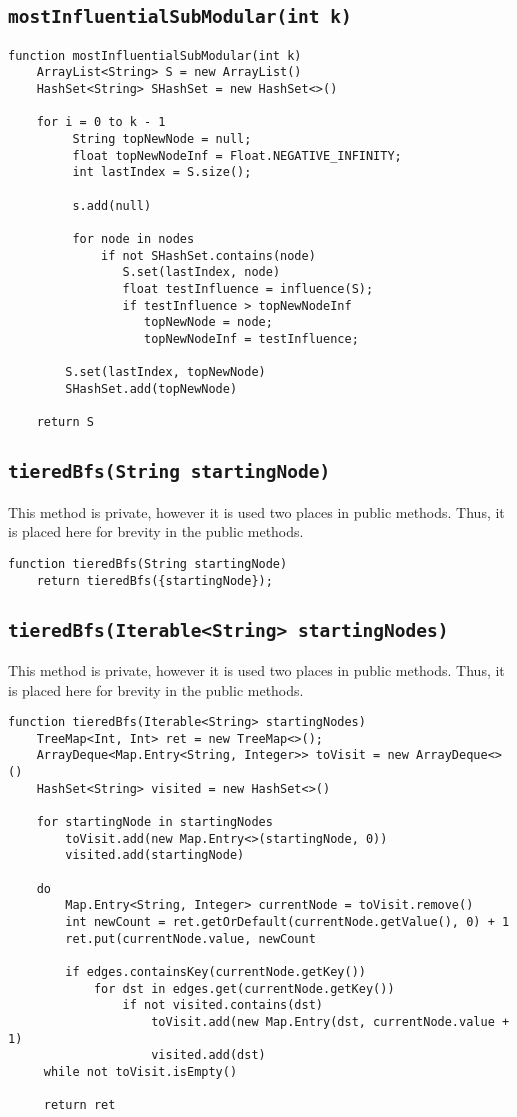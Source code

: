 \documentclass[10pt,letterpaper]{article}
\begin{document}
\subsection{\texttt{mostInfluentialSubModular(int k)}}
\begin{verbatim}
function mostInfluentialSubModular(int k)
    ArrayList<String> S = new ArrayList()
    HashSet<String> SHashSet = new HashSet<>()
    
    for i = 0 to k - 1
         String topNewNode = null;
         float topNewNodeInf = Float.NEGATIVE_INFINITY;
         int lastIndex = S.size();
         
         s.add(null)
         
         for node in nodes
             if not SHashSet.contains(node)
                S.set(lastIndex, node)
                float testInfluence = influence(S);
                if testInfluence > topNewNodeInf
                   topNewNode = node;
                   topNewNodeInf = testInfluence;
        
        S.set(lastIndex, topNewNode)
        SHashSet.add(topNewNode)
       
    return S
\end{verbatim}
\subsection{\texttt{tieredBfs(String startingNode)}}
This method is private, however it is used two places in public methods. Thus,
it is placed here for brevity in the public methods.
\begin{verbatim}
function tieredBfs(String startingNode)
    return tieredBfs({startingNode});
\end{verbatim}
\subsection{\texttt{tieredBfs(Iterable<String> startingNodes)}}
This method is private, however it is used two places in public methods. Thus,
it is placed here for brevity in the public methods.
\begin{verbatim}
function tieredBfs(Iterable<String> startingNodes)
    TreeMap<Int, Int> ret = new TreeMap<>();
    ArrayDeque<Map.Entry<String, Integer>> toVisit = new ArrayDeque<>()
    HashSet<String> visited = new HashSet<>()

    for startingNode in startingNodes
        toVisit.add(new Map.Entry<>(startingNode, 0))
        visited.add(startingNode)

    do
        Map.Entry<String, Integer> currentNode = toVisit.remove()
        int newCount = ret.getOrDefault(currentNode.getValue(), 0) + 1
        ret.put(currentNode.value, newCount

        if edges.containsKey(currentNode.getKey())
            for dst in edges.get(currentNode.getKey())
                if not visited.contains(dst)
                    toVisit.add(new Map.Entry(dst, currentNode.value + 1)
                    visited.add(dst)
     while not toVisit.isEmpty()

     return ret
\end{verbatim}
\end{document}
